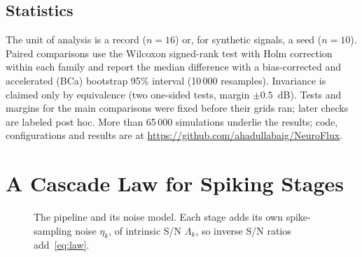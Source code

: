 \documentclass[conference]{IEEEtran}
\newcommand{\dB}{~dB}
\begin{document}
\subsection{Statistics}
The unit of analysis is a record ($n = 16$) or, for synthetic signals, a seed
($n = 10$). Paired comparisons use the Wilcoxon signed-rank test with Holm
correction within each family and report the median difference with a
bias-corrected and accelerated (BCa) bootstrap 95\% interval (10\,000
resamples). Invariance is claimed only by equivalence (two one-sided tests,
margin $\pm 0.5$\dB{}). Tests and margins for the main comparisons were fixed
before their grids ran; later checks are labeled post hoc. More than
65\,000 simulations underlie the results; code, configurations and results are
at \url{https://github.com/ahadullabaig/NeuroFlux}.

\section{A Cascade Law for Spiking Stages}
\label{sec:law}

\begin{figure}[t]
\centering
{}
\caption{The pipeline and its noise model. Each stage adds its own
spike-sampling noise $\eta_k$, of intrinsic S/N $\Lambda_k$, so inverse S/N
ratios add~\eqref{eq:law}.}
\label{fig:pipeline}
\end{figure}
\end{document}
